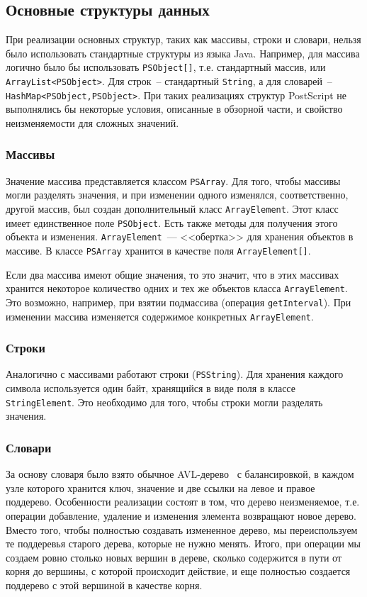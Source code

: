 \documentclass[14pt]{extarticle}
\begin{document}
\subsection{Основные структуры данных}
При реализации основных структур, таких как массивы, строки и словари, нельзя было использовать стандартные структуры из языка Java. Например, для массива логично было бы использовать \texttt{PSObject[]}, т.е. стандартный массив, или \texttt{ArrayList<PSObject>}. Для строк~-- стандартный \texttt{String}, а для словарей~-- \texttt{HashMap<PSObject,PSObject>}. При таких реализациях структур PostScript не выполнялись бы некоторые условия, описанные в обзорной части, и свойство неизменяемости для сложных значений.

\subsubsection*{Массивы}
Значение массива представляется классом \texttt{PSArray}. Для того, чтобы массивы могли разделять значения, и при изменении одного изменялся, соответственно, другой массив, был создан дополнительный класс \texttt{ArrayElement}. Этот класс имеет единственное поле \texttt{PSObject}. Есть также методы для получения этого объекта и изменения. \texttt{ArrayElement}~--- <<обертка>> для хранения объектов в массиве. В классе \texttt{PSArray} хранится в качестве поля \texttt{ArrayElement[]}. 

Если два массива имеют общие значения, то это значит, что в этих массивах хранится некоторое количество одних и тех же объектов класса \texttt{ArrayElement}. Это возможно, например, при взятии подмассива (операция \texttt{getInterval}). При изменении массива изменяется содержимое конкретных \texttt{ArrayElement}.

\subsubsection*{Строки}
Аналогично с массивами работают строки (\texttt{PSString}). Для хранения каждого символа используется один байт, хранящийся в виде поля в классе \texttt{StringElement}. Это необходимо для того, чтобы строки могли разделять значения.

\subsubsection*{Словари}
За основу словаря было взято обычное AVL-дерево~\cite{cormen} с балансировкой, в каждом узле которого хранится ключ, значение и две ссылки на левое и правое поддерево. Особенности реализации состоят в том, что дерево неизменяемое, т.е. операции добавление, удаление и изменения элемента возвращают новое дерево. Вместо того, чтобы полностью создавать измененное дерево, мы переиспользуем те поддеревья старого дерева, которые не нужно менять. Итого, при операции мы создаем  ровно столько новых вершин в дереве, сколько содержится в пути от корня до вершины, с которой происходит действие, и еще полностью создается поддерево с этой вершиной в качестве корня.
\end{document}
